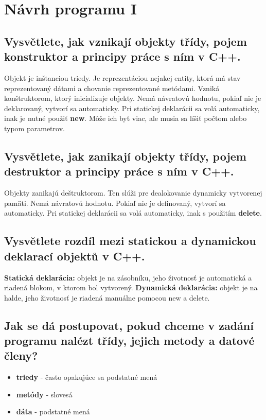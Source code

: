\section{Návrh programu I}

\subsection{Vysvětlete, jak vznikají objekty třídy, pojem konstruktor a principy práce s ním v C++.}
Objekt je inštanciou triedy. Je reprezentáciou nejakej entity, ktorá má stav reprezentovaný dátami a chovanie reprezentované metódami.\newline
Vzniká konštruktorom, ktorý inicializuje objekty. Nemá návratovú hodnotu, pokiaľ nie je deklarovaný, vytvorí sa automaticky. Pri statickej deklarácii sa volá automaticky, inak je nutné použiť \textbf{new}. Môže ich byť viac, ale musia sa líšiť počtom alebo typom parametrov.


\subsection{Vysvětlete, jak zanikají objekty třídy, pojem destruktor a principy práce s ním v C++.}
Objekty zanikajú deštruktorom. Ten slúži pre dealokovanie dynamicky vytvorenej pamäti. Nemá návratovú hodnotu. Pokiaľ nie je definovaný, vytvorí sa automaticky. Pri statickej deklarácii sa volá automaticky, inak s použitím \textbf{delete}.


\subsection{Vysvětlete rozdíl mezi statickou a dynamickou deklarací objektů v C++.}
\textbf{Statická deklarácia:} objekt je na zásobníku, jeho životnosť je automatická a riadená blokom, v ktorom bol vytvorený. \newline
\textbf{Dynamická deklarácia:} objekt je na halde, jeho životnosť je riadená manuálne pomocou new a delete.


\subsection{Jak se dá postupovat, pokud chceme v zadání programu nalézt třídy, jejich metody a datové
členy?}
\begin{itemize}
    \item \textbf{triedy} - často opakujúce sa podstatné mená
    \item \textbf{metódy} - slovesá
    \item \textbf{dáta} - podstatné mená
\end{itemize}


